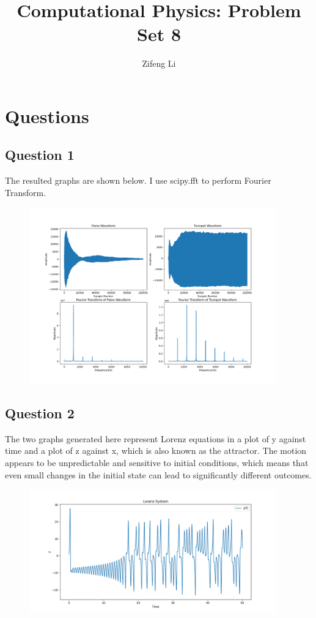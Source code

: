 \documentclass[11pt]{article}
\title{Computational Physics: Problem Set 8}
\author{Zifeng Li}
\begin{document}
\maketitle

\section{Questions}

\subsection{Question 1}
The resulted graphs are shown below. I use scipy.fft to perform Fourier Transform.
\begin{figure}[b!]
\centering
\includegraphics[width=0.95\textwidth]{Instrument Waveform and Their Fourier Transform.png}
\end{figure}



\subsection{Question 2}
The two graphs generated here represent Lorenz equations in a plot of y against
time and a plot of z against x, which is also known as the attractor.
The motion appears to be unpredictable and sensitive to initial conditions, which
means that even small changes in the initial state can lead to significantly different outcomes.

\begin{figure}[b!]
\centering
\includegraphics[width=0.95\textwidth]{Lorenz System.png}
\end{figure}
\end{document}
